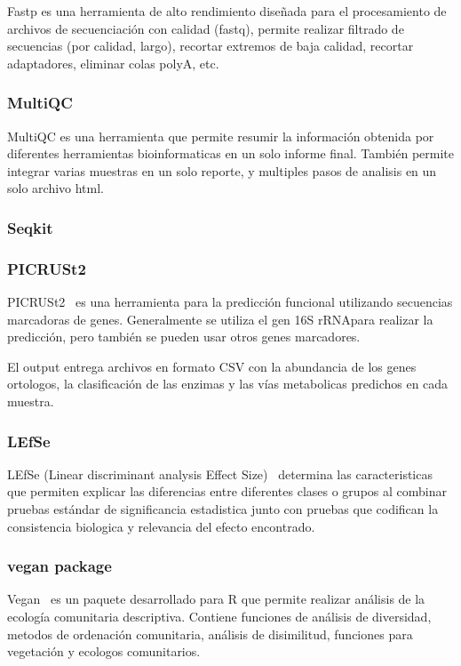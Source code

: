 Fastp\cite{chen2018fastp} es una herramienta de alto rendimiento diseñada para el procesamiento de archivos de secuenciación con calidad (fastq), permite realizar filtrado de secuencias (por calidad, largo), recortar extremos de baja calidad, recortar adaptadores, eliminar colas polyA, etc.
\subsubsection{MultiQC}
MultiQC \cite{ewels2016multiqc} es una herramienta que permite resumir la información obtenida por diferentes herramientas bioinformaticas en un solo informe final. También permite integrar varias muestras en un solo reporte, y multiples pasos de analisis en un solo archivo html.


\subsubsection{Seqkit}

\subsubsection{PICRUSt2}
PICRUSt2~\cite{douglas2020picrust2} es una herramienta para la predicción funcional utilizando secuencias marcadoras de genes.
Generalmente se utiliza el gen 16S rRNApara realizar la predicción, pero también se pueden usar otros genes marcadores.

El output entrega archivos en formato CSV con la abundancia de los genes ortologos, la clasificación de las enzimas y las vías metabolicas predichos en cada muestra.

\subsubsection{LEfSe}
LEfSe (Linear discriminant analysis Effect Size)~\cite{segata2011metagenomic}  determina las caracteristicas que permiten explicar las diferencias entre diferentes clases o grupos al combinar pruebas estándar de significancia estadistica junto con pruebas que codifican la consistencia biologica y relevancia del efecto encontrado. 
\subsubsection{vegan package}
Vegan~\cite{dixon2003vegan} es un paquete desarrollado para R que permite realizar análisis de la ecología comunitaria descriptiva. Contiene funciones de análisis de diversidad,  metodos de ordenación comunitaria, análisis de disimilitud, funciones para vegetación y ecologos comunitarios.

